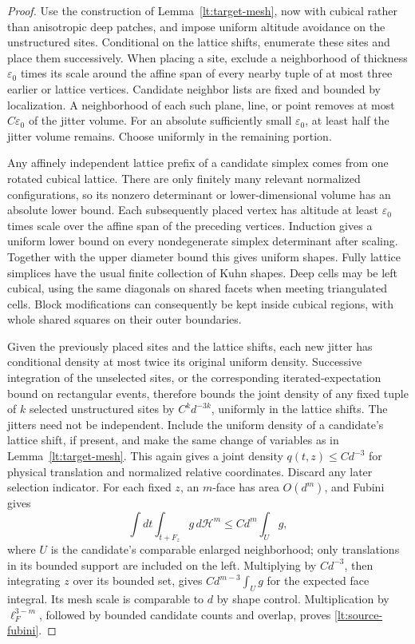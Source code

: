 \documentclass[11pt]{article}
\numberwithin{equation}{section}
\theoremstyle{definition}
\theoremstyle{remark}
\begin{document}
\begin{proof}
Use the construction of Lemma~\ref{lt:target-mesh}, now with
cubical rather than anisotropic deep patches, and impose
uniform altitude avoidance on the unstructured sites.  Conditional
on the lattice shifts, enumerate these sites and place them
successively.  When placing a site, exclude a neighborhood of
thickness $\varepsilon_0$ times its scale around the affine span
of every nearby tuple of at most three earlier or lattice
vertices.  Candidate neighbor lists are fixed and bounded by
localization.  A neighborhood of each such plane, line, or
point removes at most $C\varepsilon_0$ of the jitter volume.
For an absolute sufficiently small $\varepsilon_0$, at least
half the jitter volume remains.  Choose uniformly in the
remaining portion.

Any affinely independent lattice prefix of a candidate simplex
comes from one rotated cubical lattice.  There are only finitely
many relevant normalized configurations, so its nonzero
determinant or lower-dimensional volume has an absolute lower
bound.  Each subsequently placed vertex has altitude at least
$\varepsilon_0$ times scale over the affine span of the preceding
vertices.  Induction gives a uniform lower bound on every
nondegenerate simplex determinant after scaling.  Together with
the upper diameter bound this gives uniform shapes.  Fully
lattice simplices have the usual finite collection of Kuhn
shapes.  Deep cells may be left cubical, using the same
diagonals on shared facets when meeting triangulated cells.
Block modifications can consequently be kept inside cubical
regions, with whole shared squares on their outer boundaries.

Given the previously placed sites and the lattice shifts, each
new jitter has conditional density at most twice its original
uniform density.  Successive integration of the unselected sites,
or the corresponding iterated-expectation bound on rectangular
events, therefore bounds the joint density of any fixed tuple of
$k$ selected unstructured sites by $C^k d^{-3k}$, uniformly in
the lattice shifts.  The jitters need not be independent.  Include the uniform density of a candidate's lattice shift, if
present, and make the same change of variables as in
Lemma~\ref{lt:target-mesh}.  This again gives a joint density
$q(t,z)\leq Cd^{-3}$ for physical translation and normalized
relative coordinates.  Discard any later selection indicator.
For each fixed $z$, an $m$-face has area $O(d^m)$, and Fubini gives
\[
 \int dt\int_{t+F_z}g\,d\mathcal H^m
       \leq Cd^m\int_{U}g,
\]
where $U$ is the candidate's comparable enlarged neighborhood;
only translations in its bounded support are included on the
left.  Multiplying by $Cd^{-3}$, then integrating $z$ over its
bounded set, gives $Cd^{m-3}\int_U g$ for the expected face
integral.  Its mesh scale is comparable to $d$ by shape control.
Multiplication by $\ell_F^{3-m}$, followed by bounded candidate
counts and overlap, proves \eqref{lt:source-fubini}.


\end{proof}
\end{document}

